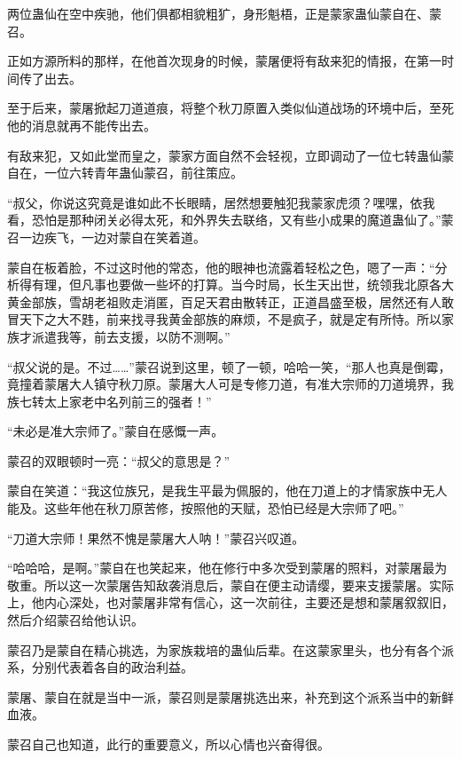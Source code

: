 
\begin{this_body}



两位蛊仙在空中疾驰，他们俱都相貌粗犷，身形魁梧，正是蒙家蛊仙蒙自在、蒙召。

正如方源所料的那样，在他首次现身的时候，蒙屠便将有敌来犯的情报，在第一时间传了出去。

至于后来，蒙屠掀起刀道道痕，将整个秋刀原置入类似仙道战场的环境中后，至死他的消息就再不能传出去。

有敌来犯，又如此堂而皇之，蒙家方面自然不会轻视，立即调动了一位七转蛊仙蒙自在，一位六转青年蛊仙蒙召，前往策应。

“叔父，你说这究竟是谁如此不长眼睛，居然想要触犯我蒙家虎须？嘿嘿，依我看，恐怕是那种闭关必得太死，和外界失去联络，又有些小成果的魔道蛊仙了。”蒙召一边疾飞，一边对蒙自在笑着道。

蒙自在板着脸，不过这时他的常态，他的眼神也流露着轻松之色，嗯了一声：“分析得有理，但凡事也要做一些坏的打算。当今时局，长生天出世，统领我北原各大黄金部族，雪胡老祖败走消匿，百足天君由散转正，正道昌盛至极，居然还有人敢冒天下之大不韪，前来找寻我黄金部族的麻烦，不是疯子，就是定有所恃。所以家族才派遣我等，前去支援，以防不测啊。”

“叔父说的是。不过……”蒙召说到这里，顿了一顿，哈哈一笑，“那人也真是倒霉，竟撞着蒙屠大人镇守秋刀原。蒙屠大人可是专修刀道，有准大宗师的刀道境界，我族七转太上家老中名列前三的强者！”

“未必是准大宗师了。”蒙自在感慨一声。

蒙召的双眼顿时一亮：“叔父的意思是？”

蒙自在笑道：“我这位族兄，是我生平最为佩服的，他在刀道上的才情家族中无人能及。这些年他在秋刀原苦修，按照他的天赋，恐怕已经是大宗师了吧。”

“刀道大宗师！果然不愧是蒙屠大人呐！”蒙召兴叹道。

“哈哈哈，是啊。”蒙自在也笑起来，他在修行中多次受到蒙屠的照料，对蒙屠最为敬重。所以这一次蒙屠告知敌袭消息后，蒙自在便主动请缨，要来支援蒙屠。实际上，他内心深处，也对蒙屠非常有信心，这一次前往，主要还是想和蒙屠叙叙旧，然后介绍蒙召给他认识。

蒙召乃是蒙自在精心挑选，为家族栽培的蛊仙后辈。在这蒙家里头，也分有各个派系，分别代表着各自的政治利益。

蒙屠、蒙自在就是当中一派，蒙召则是蒙屠挑选出来，补充到这个派系当中的新鲜血液。

蒙召自己也知道，此行的重要意义，所以心情也兴奋得很。


\end{this_body}
